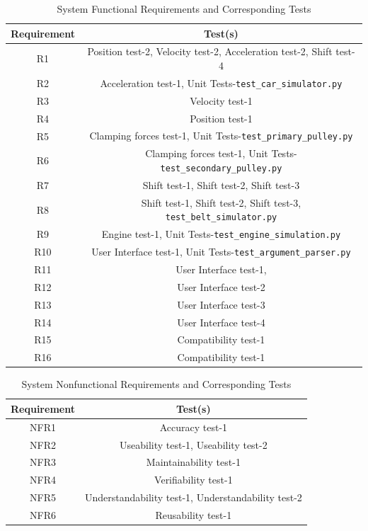 \documentclass[12pt, titlepage]{article}
\begin{document}
\begin{table}[H]
  \centering
    \begin{tabular}{|c|c|}
      \hline
      \textbf{Requirement} & \textbf{Test(s)} \\ \hline
      R1 & Position test-2, Velocity test-2, Acceleration test-2, Shift test-4  \\ \hline
      R2 & Acceleration test-1, Unit Tests-\texttt{test\_car\_simulator.py} \\ \hline
      R3 & Velocity test-1 \\ \hline
      R4 & Position test-1 \\ \hline
      R5 & Clamping forces test-1, Unit Tests-\texttt{test\_primary\_pulley.py} \\ \hline
      R6 & Clamping forces test-1, Unit Tests-\texttt{test\_secondary\_pulley.py} \\ \hline
      R7 & Shift test-1, Shift test-2, Shift test-3 \\ \hline
      R8 & Shift test-1, Shift test-2, Shift test-3, \texttt{test\_belt\_simulator.py}  \\ \hline
      R9 & Engine test-1, Unit Tests-\texttt{test\_engine\_simulation.py} \\ \hline
      R10 & User Interface test-1, Unit Tests-\texttt{test\_argument\_parser.py}  \\ \hline
      R11 & User Interface test-1, \\ \hline
      R12 & User Interface test-2 \\ \hline
      R13 & User Interface test-3 \\ \hline
      R14 & User Interface test-4 \\ \hline
      R15 & Compatibility test-1 \\ \hline
      R16 & Compatibility test-1 \\ \hline
      \end{tabular}
      \caption{System Functional Requirements and Corresponding Tests}
      \label{tab:requirements_tests}
  \end{table}

  \begin{table}[h!]
    \centering
      \begin{tabular}{|c|c|}
        \hline
        \textbf{Requirement} & \textbf{Test(s)} \\ \hline
        NFR1 & Accuracy test-1  \\ \hline
        NFR2 & Useability test-1, Useability test-2 \\ \hline
        NFR3 & Maintainability test-1 \\ \hline
        NFR4 & Verifiability test-1 \\ \hline
        NFR5 & Understandability test-1, Understandability test-2 \\ \hline
        NFR6 & Reusability test-1 \\ \hline
        \end{tabular}
        \caption{System Nonfunctional Requirements and Corresponding Tests}
        \label{tab:requirements_tests}
    \end{table}
		
\end{document}
